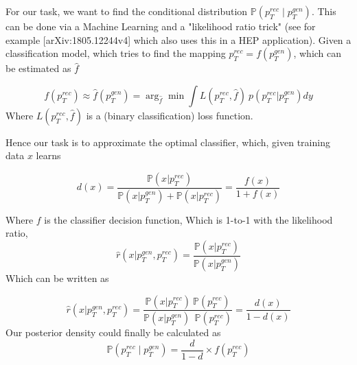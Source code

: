 For our task, we want to find the conditional distribution $\mathbb{P}\left(p_{T}^{r e c} \mid p_{T}^{g e n}\right)$. This can be done via a Machine Learning and a "likelihood ratio trick" (see for example [arXiv:1805.12244v4] which also uses this in a HEP application). Given a classification model, which tries to find the mapping $p_T^{rec} = f(p_T^{gen})$, which can be estimated as $\hat{f}$

\begin{equation}
f(p_T^{rec}) \approx \hat{f}(p_T^{gen})=\arg _{\hat{f}} \min \int L(p_T^{rec}, \hat{f}) \ p(p_T^{rec} | p_T^{gen}) d y
\end{equation}
Where $ L(p_T^{rec}, \hat{f})$ is a (binary classification) loss function.

Hence our task is to approximate the optimal classifier, which, given training data $x$ learns

\begin{equation}
d(x)=\frac{\mathbb{P}\left(x | p_T^{rec}\right)}{\mathbb{P}\left(x | p_T^{gen}\right)+\mathbb{P}\left(x | p_T^{rec}\right)}=\frac{f(x)}{1+f(x)}
\end{equation}


Where $f$ is the classifier decision function, Which is 1-to-1 with the likelihood ratio,
\begin{equation}
\hat{r} (x| p_T^{gen}, p_T^{rec})=\frac{\mathbb{P}\left(x | p_T^{rec}\right)}{\mathbb{P}\left(x | p_T^{gen}\right)}
\end{equation}
Which can be written as 

\begin{equation}
\hat{r} (x| p_T^{gen}, p_T^{rec})=\frac{\mathbb{P}\left(x | p_T^{rec}\right) \ \mathbb{P}(p_T^{rec})}{\mathbb{P}\left(x | p_T^{gen}\right) \ \ \mathbb{P}(p_T^{rec})} =\frac{d(x)}{1-d(x)}
\end{equation}
Our posterior density could finally be calculated as
\begin{equation}
    \mathbb{P}\left(p_{T}^{r e c} \mid p_{T}^{g e n}\right)=\frac{d}{1-d} \times f\left(p_{T}^{r e c}\right)
    \label{ratio_trick_posterior}
\end{equation}

